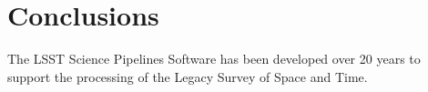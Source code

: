 \section{Conclusions}

The LSST Science Pipelines Software has been developed over 20 years to support the processing of the Legacy Survey of Space and Time.
